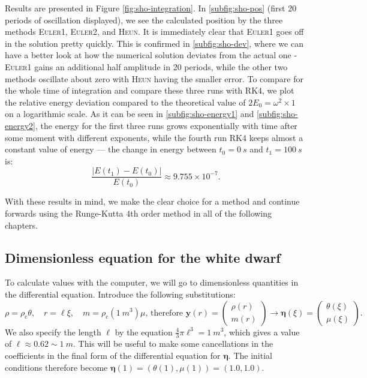 \documentclass[]{article}
\renewcommand{\vec}[1]{\boldsymbol{#1}}
\newcommand{\rhoCentre}{\rho_\mathrm{c}}
\newcommand{\eulerOne}{\textsc{Euler1}}
\newcommand{\eulerTwo}{\textsc{Euler2}}
\newcommand{\heun}{\textsc{Heun}}
\newcommand{\rkFour}{\textsc{RK4}}
\begin{document}
	Results are presented in Figure \ref{fig:sho-integration}. In \ref{subfig:sho-pos} (first 20 periods of oscillation displayed), we see the calculated position by the three methods \eulerOne{}, \eulerTwo{}, and \heun{}. It is immediately clear that \eulerOne{} goes off in the solution pretty quickly. This is confirmed in \ref{subfig:sho-dev}, where we can have a better look at how the numerical solution deviates from the actual one - \eulerOne{} gains an additional half amplitude in 20 periods, while the other two methods oscillate about zero with \heun{} having the smaller error. To compare for the whole time of integration and compare these three runs with \rkFour{}, we plot the relative energy deviation compared to the theoretical value of $2E_0 = \omega^2 \times 1$ on a logarithmic scale. As it can be seen in \ref{subfig:sho-energy1} and \ref{subfig:sho-energy2}, the energy for the first three runs grows exponentially with time after some moment with different exponents, while the fourth run \rkFour{} keeps almost a constant value of energy --- the change in energy between $t_0=\SI{0}{s}$ and $t_1=\SI{100}{s}$ is:
	\begin{equation}
		\frac{\big| E(t_1) - E(t_0) \big|}{E(t_0)} \approx 9.755 \times 10^{-7}.
	\end{equation}

	With these results in mind, we make the clear choice for a method and continue forwards using the Runge-Kutta 4th order method in all of the following chapters.


\subsection{Dimensionless equation for the white dwarf}
	To calculate values with the computer, we will go to dimensionless quantities in the differential equation. Introduce the following substitutions:
	\begin{equation}
		\rho = \rhoCentre \theta, \quad r = \ell \xi, \quad m = \rhoCentre (\SI{1}{m^3}) \mu \text{, therefore } \vec{y}(r) = \begin{pmatrix}\rho(r) \\ m(r)\end{pmatrix} \rightarrow \vec{\eta}(\xi) = \begin{pmatrix}\theta(\xi)\\\mu(\xi)\end{pmatrix}.
	\end{equation}
	We also specify the length $\ell$ by the equation $\frac{4}{3}\pi \ell^3 = \SI{1}{m^3}$, which gives a value of $\ell \approx 0.62 \sim \SI{1}{m}$. This will be useful to make some cancellations in the coefficients in the final form of the differential equation for $\vec{\eta}$. The initial conditions therefore become $\vec{\eta}(1) = \left( \theta(1), \mu(1)\right) = \left(1.0, 1.0 \right)$.
\end{document}
